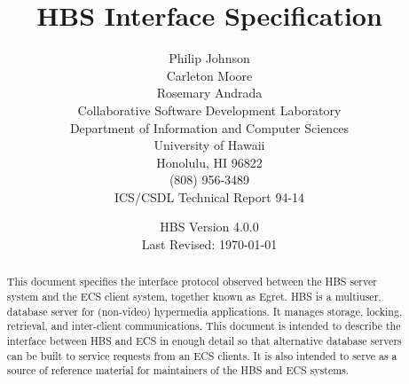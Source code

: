 




\title{{\bf HBS Interface Specification}}
\author {Philip Johnson\\Carleton Moore\\Rosemary Andrada\\
Collaborative Software Development Laboratory\\ 
Department of Information and Computer Sciences\\
University of Hawaii\\
Honolulu, HI 96822\\
(808) 956-3489\\
ICS/CSDL Technical Report 94-14}

\date{HBS Version 4.0.0\\
      Last Revised: \today}

\maketitle

\begin{abstract}
This document specifies the interface protocol observed between the HBS
server system and the ECS client system, together known as Egret. HBS is a
multiuser, database server for (non-video) hypermedia applications.  It
manages storage, locking, retrieval, and inter-client communications.
This document is intended to describe the interface between
HBS and ECS in enough detail so that alternative database servers can be
built to service requests from an ECS clients. It is also intended to serve as a source
of reference material for maintainers of the HBS and ECS systems. 
\end{abstract}
\newpage
\tableofcontents

